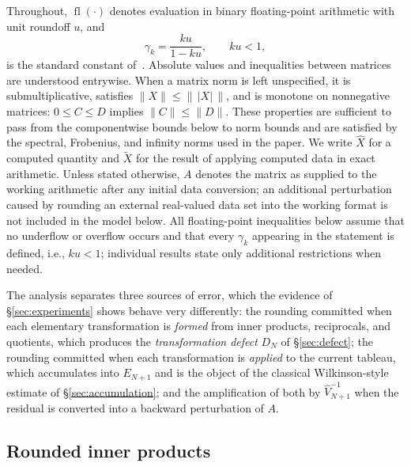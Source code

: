 \documentclass[review,onefignum,onetabnum]{siamart251216}
\newcommand{\fl}{\operatorname{fl}}
\begin{document}
Throughout, $\fl(\cdot)$ denotes evaluation in binary floating-point arithmetic with unit
roundoff $u$, and
%
\begin{equation}\label{eq:gamma}
\gamma_k = \frac{ku}{1-ku}, \qquad ku<1,
\end{equation}
%
is the standard constant of~\cite[Ch.~3]{Higham2002}. Absolute values and inequalities
between matrices are understood entrywise. When a matrix norm is left unspecified, it is
submultiplicative, satisfies $\|X\|\le\bigl\|\,|X|\,\bigr\|$, and is monotone on nonnegative matrices:
$0\le C\le D$ implies $\|C\|\le\|D\|$.  These properties are sufficient to pass from the
componentwise bounds below to norm bounds and are satisfied by the spectral, Frobenius, and
infinity norms used in the paper. We write
$\widehat X$ for a computed quantity
and $\widetilde X$ for the result of applying computed data in exact arithmetic. Unless stated
otherwise, $A$ denotes the matrix as supplied to the working arithmetic after any initial data
conversion; an additional perturbation caused by rounding an external real-valued data set into
the working format is not included in the model below. All floating-point inequalities below assume
that no underflow or overflow occurs and that every $\gamma_k$ appearing in the statement is
defined, i.e., $ku<1$; individual results state only additional restrictions when needed.

The analysis separates three sources of error, which the evidence of \S\ref{sec:experiments}
shows behave very differently: the rounding committed when each elementary transformation is
\emph{formed} from inner products, reciprocals, and quotients, which produces the
\emph{transformation defect} $D_N$ of \S\ref{sec:defect}; the rounding committed when each
transformation is \emph{applied} to the current tableau, which accumulates into $E_{N+1}$ and
is the object of the classical Wilkinson-style estimate of \S\ref{sec:accumulation}; and the
amplification of both by $\widehat V_{N+1}^{-1}$ when the residual is converted into a backward
perturbation of $A$.

\subsection{Rounded inner products}
\label{sec:inner}
\end{document}
